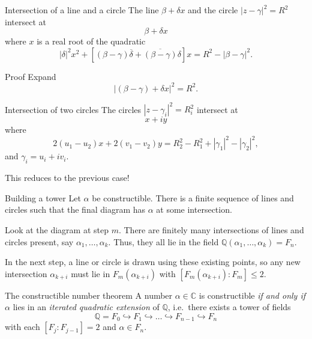 \documentclass[handout]{beamer}
\def\C{\mathbb{C}}
\def\Q{\mathbb{Q}}
\begin{document}
    \begin{frame}{Intersection of a line and a circle}
        The line $\beta + \delta x$ and the circle $|z - \gamma|^2 = R^2$
        intersect at \[
            \beta + \delta x
        \] where $x$ is a real root of the quadratic \[
            |\delta|^2 x^2 + \left[(\beta - \gamma)\overline{\delta} +
            \overline{(\beta - \gamma)}\delta\right]x = R^2 - |\beta - \gamma|^2.
        \]


        \begin{block}{Proof} \vspace{0.1em}
            Expand \[
                |(\beta - \gamma) + \delta x|^2 = R^2.
            \]
        \end{block}
    \end{frame}

    \begin{frame}{Intersection of two circles}
        The circles $|z - \gamma_i|^2 = R_i^2$ intersect at \[
            x + iy
        \] where \[
            2(u_1 - u_2)x + 2(v_1 - v_2)y = R_2^2 - R_1^2 + |\gamma_1|^2 -
            |\gamma_2|^2,
        \] and $\gamma_i = u_i + iv_i$.


        This reduces to the previous case!
    \end{frame}

    \begin{frame}{Building a tower}
        Let $\alpha$ be constructible. There is a finite sequence of lines and
        circles such that the final diagram has $\alpha$ at some intersection.

        \pause

        Look at the diagram at step $m$. There are finitely many intersections of
        lines and circles present, say $\alpha_1, \dots, \alpha_k$. Thus, they all
        lie in the field $\Q(\alpha_1, \dots, \alpha_k) = F_n$.

        \pause

        In the next step, a line or circle is drawn using these existing points, so
        any new intersection $\alpha_{k + i}$ must lie in $F_m(\alpha_{k + i})$ with
        $[F_m(\alpha_{k + i}) : F_m] \leq 2$.
    \end{frame}

    \begin{frame}{The constructible number theorem}
        A number $\alpha \in \C$ is constructible \emph{if and only if} $\alpha$ lies
        in an \emph{iterated quadratic extension} of $\Q$, i.e.\ there exists a tower
        of fields \[
            \Q = F_0 \hookrightarrow F_1 \hookrightarrow \dots \hookrightarrow F_{n -
            1} \hookrightarrow F_n
        \] with each $[F_j : F_{j - 1}] = 2$ and $\alpha \in F_n$.
    \end{frame}
\end{document}
